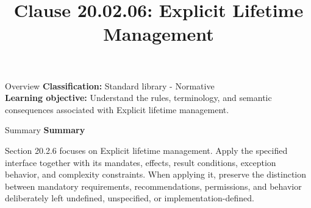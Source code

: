 \documentclass[10pt,letterpaper]{article}
\title{Clause 20.02.06: Explicit Lifetime Management}
\author{}
\date{}
\begin{document}
\maketitle
\begin{CornellOverviewBox}{Overview}
\textbf{Classification:} Standard library - Normative\\[2pt]
\textbf{Learning objective:} Understand the rules, terminology, and semantic consequences associated with Explicit lifetime management.
\end{CornellOverviewBox}\begin{CornellSummaryBox}{Summary}
{\sffamily\bfseries\color{Accent} Summary}\par\vspace{3pt}Section 20.2.6 focuses on Explicit lifetime management. Apply the specified interface together with its mandates, effects, result conditions, exception behavior, and complexity constraints. When applying it, preserve the distinction between mandatory requirements, recommendations, permissions, and behavior deliberately left undefined, unspecified, or implementation-defined.
\end{CornellSummaryBox}
\end{document}
